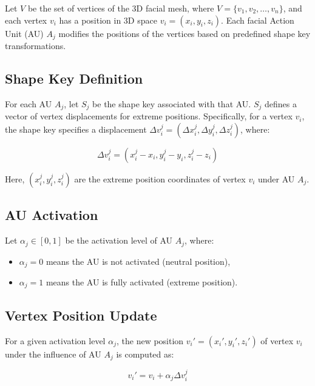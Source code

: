 \documentclass[../../main]{subfiles}
\begin{document}
Let \( V \) be the set of vertices of the 3D facial mesh, where \( V = \{ v_1, v_2, \dots, v_n \} \), and each vertex \( v_i \) has a position in 3D space \( v_i = (x_i, y_i, z_i) \). Each facial Action Unit (AU) \( A_j \) modifies the positions of the vertices based on predefined shape key transformations.

\subsection{Shape Key Definition}
\label{ch:facial_expressions:blendshape_creation:shape_key_definition}

For each AU \( A_j \), let \( S_j \) be the shape key associated with that AU. \( S_j \) defines a vector of vertex displacements for extreme positions. Specifically, for a vertex \( v_i \), the shape key specifies a displacement \( \Delta v_i^j = (\Delta x_i^j, \Delta y_i^j, \Delta z_i^j) \), where:

\[
\Delta v_i^j = (x_i^j - x_i, y_i^j - y_i, z_i^j - z_i)
\]

Here, \( (x_i^j, y_i^j, z_i^j) \) are the extreme position coordinates of vertex \( v_i \) under AU \( A_j \).

\subsection{AU Activation}
\label{ch:facial_expressions:blendshape_creation:au_activation}

Let \( \alpha_j \in [0, 1] \) be the activation level of AU \( A_j \), where:
\begin{itemize}
    \item \( \alpha_j = 0 \) means the AU is not activated (neutral position),
    \item \( \alpha_j = 1 \) means the AU is fully activated (extreme position).
\end{itemize}

\subsection{Vertex Position Update}
\label{ch:facial_expressions:blendshape_creation:vertex_position_update}

For a given activation level \( \alpha_j \), the new position \( v_i' = (x_i', y_i', z_i') \) of vertex \( v_i \) under the influence of AU \( A_j \) is computed as:

\[
v_i' = v_i + \alpha_j \Delta v_i^j
\]
\end{document}
